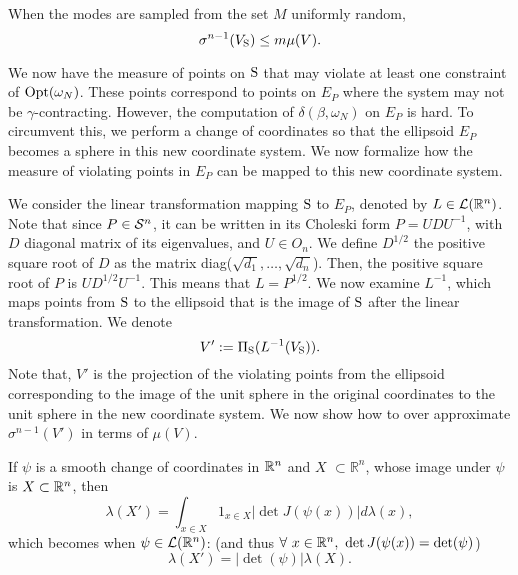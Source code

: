 \begin{corollary} \label{cor:measure}When the modes are sampled from the set $M$ uniformly random, 
\begin{equation*}\sigma^{n-1}(V_{\text{S}}) \leq m \mu(V). \end{equation*}
\end{corollary}

We now have the measure of points on $\text{S}$ that may violate at least one constraint of $\text{Opt}(\omega_N)$. These points correspond to points on $E_P$ where the system may not be $\gamma$-contracting. However, the computation of $\delta(\beta, \omega_N)$ on $E_P$ is hard. To circumvent this, we perform a change of coordinates so that the ellipsoid $E_P$ becomes a sphere in this new coordinate system. We now formalize how the measure of violating points in $E_P$ can be mapped to this new coordinate system.

We consider the linear transformation mapping $\text{S}$ to $E_P$, denoted by $L \in \mathcal{L}(\mathbb{R}^n)$. Note that since $P \in \mathcal{S}^n$, it can be written in its Choleski form $P = U D U^{-1}$, with $D$ diagonal matrix of its eigenvalues, and $U \in O_n$. We define $D^{1/2}$ the positive square root of $D$ as the matrix diag($\sqrt{d_1},\dots, \sqrt{d_n}$). Then, the positive square root of $P$ is $U D^{1/2} U^{-1}$. This means that $L = P^{1/2}$. 
We now examine $L^{-1}$, which maps points from $\text{S}$ to the ellipsoid that is the image of $\text{S}$ after the linear transformation. We denote $$V':=\Pi_{\text{S}}(L^{-1}(V_{\text{S}})).$$
Note that, $V'$ is the projection of the violating points from the ellipsoid corresponding to the image of the unit sphere in the original coordinates to the unit sphere in the new coordinate system.  We now show how to over approximate $\sigma^{n-1}(V')$ in terms of $\mu(V)$.

\begin{remark} \label{rem:mappingMeasures}
If $\psi$ is a smooth change of coordinates in $\mathbb{R}^n$ and $X$ $\subset \mathbb{R}^n$, whose image under $\psi$ is $X \subset \mathbb{R}^n$, then
\begin{equation}
\lambda(X') = \int_{x \in X} 1_{x \in X} |\det J(\psi(x))| d\lambda(x),
\end{equation}
which becomes when $\psi \in \mathcal{L}(\mathbb{R}^n)$: (and thus $\forall\ x \in \R^n, \ \det J(\psi(x)) = \det(\psi)$)
\begin{equation}
\lambda(X') = |\det(\psi)| \lambda(X).
\end{equation}
\end{remark}

